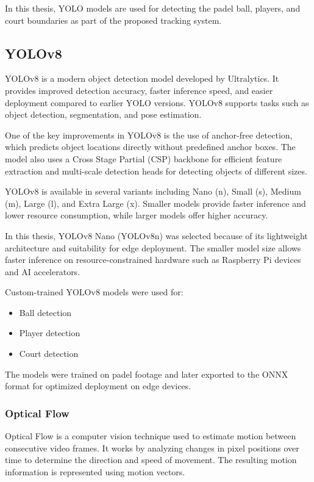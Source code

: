 In this thesis, YOLO models are used for detecting the padel ball, players, and court boundaries as part of the proposed tracking system.

\subsection{YOLOv8}

YOLOv8 is a modern object detection model developed by Ultralytics. It provides improved detection accuracy, faster inference speed, and easier deployment compared to earlier YOLO versions. YOLOv8 supports tasks such as object detection, segmentation, and pose estimation.

One of the key improvements in YOLOv8 is the use of anchor-free detection, which predicts object locations directly without predefined anchor boxes. The model also uses a Cross Stage Partial (CSP) backbone for efficient feature extraction and multi-scale detection heads for detecting objects of different sizes.

YOLOv8 is available in several variants including Nano (n), Small (s), Medium (m), Large (l), and Extra Large (x). Smaller models provide faster inference and lower resource consumption, while larger models offer higher accuracy.

In this thesis, YOLOv8 Nano (YOLOv8n) was selected because of its lightweight architecture and suitability for edge deployment. The smaller model size allows faster inference on resource-constrained hardware such as Raspberry Pi devices and AI accelerators.

Custom-trained YOLOv8 models were used for:
\begin{itemize}
    \item Ball detection
    \item Player detection
    \item Court detection
\end{itemize}

The models were trained on padel footage and later exported to the ONNX format for optimized deployment on edge devices.

\subsubsection{Optical Flow}

Optical Flow is a computer vision technique used to estimate motion between consecutive video frames. It works by analyzing changes in pixel positions over time to determine the direction and speed of movement. The resulting motion information is represented using motion vectors.

